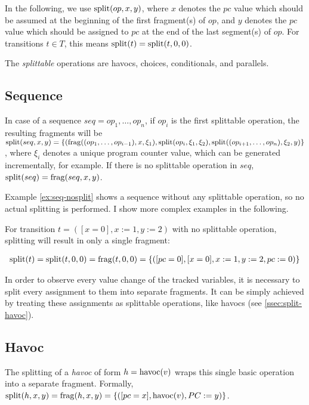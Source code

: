 In the following, we use $\mathrm{split}(op, x, y)$, where $x$ denotes the $pc$ value which should be assumed at the beginning of the first fragment(s) of $op$, and $y$ denotes the $pc$ value which should be assigned to $pc$ at the end of the last segment(s) of $op$. For transitions $t \in T$, this means $\mathrm{split}(t) = \mathrm{split}(t, 0, 0)$.

The \textit{splittable} operations are havocs, choices, conditionals, and parallels.

\subsection{Sequence}
In case of a sequence $seq = op_1, \ldots, op_n$, if $op_i$ is the first splittable operation, the resulting fragments will be $\mathrm{split}(seq, x, y) = \{ (\mathrm{frag}((op_1, \ldots, op_{i-1}), x, \xi_1), \mathrm{split}(op_i, \xi_1, \xi_2), \mathrm{split}((op_{i+1}, \ldots, op_n), \xi_2, y)\}$, where $\xi_i$ denotes a unique program counter value, which can be generated incrementally, for example. If there is no splittable operation in $seq$, $\mathrm{split}(seq) = \mathrm{frag}(seq, x, y)$.

Example \ref{ex:seq-nosplit} shows a sequence without any splittable operation, so no actual splitting is performed. I show more complex examples in the following.

\begin{example}\label{ex:seq-nosplit} For transition $t = ([x = 0], x := 1, y := 2)$ with no splittable operation, splitting will result in only a single fragment:

\begin{align*}
\mathrm{split}(t) = \mathrm{split}(t,0,0) = \mathrm{frag}(t,0,0) = \{ ([pc = 0], [x = 0], x := 1, y := 2, pc := 0) \}
\end{align*}
\end{example}

In order to observe every value change of the tracked variables, it is necessary to split every assignment to them into separate fragments. It can be simply achieved by treating these assignments as splittable operations, like havocs (see \autoref{ssec:split-havoc}).

\subsection{Havoc}\label{ssec:split-havoc}
The splitting of a \textit{havoc} of form $h = \mathrm{havoc}(v)$ wraps this single basic operation into a separate fragment. Formally, $\mathrm{split}(h, x, y) = \mathrm{frag}(h, x, y) = \{ ([pc = x], \mathrm{havoc}(v), PC := y) \}$.


